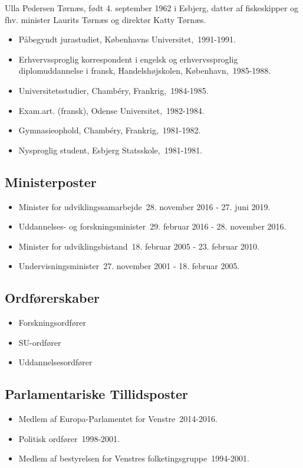 \documentclass[11pt, a4paper]{awesome-cv}
\begin{document}
\makecvheader[R]
\makelettertitle
\begin{cvletter}
Ulla Pedersen Tørnæs, født 4. september 1962 i Esbjerg, datter af fiskeskipper og fhv. minister Laurits Tørnæs og direktør Katty Tørnæs.

\begin{itemize}
\item Påbegyndt jurastudiet, Københavns Universitet, 1991-1991.
\item Erhvervssproglig korrespondent i engelsk og erhvervssproglig diplomuddannelse i fransk, Handelshøjskolen, København, 1985-1988.
\item Universitetsstudier, Chambéry, Frankrig, 1984-1985.
\item Exam.art. (fransk), Odense Universitet, 1982-1984.
\item Gymnasieophold, Chambéry, Frankrig, 1981-1982.
\item Nysproglig student, Esbjerg Statsskole, 1981-1981.
\end{itemize}
\subsection*{Ministerposter}
\begin{itemize}
\item Minister for udviklingssamarbejde 28. november 2016 - 27. juni 2019.
\item Uddannelses- og forskningsminister 29. februar 2016 - 28. november 2016.
\item Minister for udviklingsbistand 18. februar 2005 - 23. februar 2010.
\item Undervisningsminister 27. november 2001 - 18. februar 2005.
\end{itemize}
\subsection*{Ordførerskaber}
\begin{itemize}
\item Forskningsordfører
\item SU-ordfører
\item Uddannelsesordfører
\end{itemize}
\subsection*{Parlamentariske Tillidsposter}
\begin{itemize}
\item Medlem af Europa-Parlamentet for Venstre 2014-2016.
\item Politisk ordfører 1998-2001.
\item Medlem af bestyrelsen for Venstres folketingsgruppe 1994-2001.
\end{itemize}

\end{cvletter}
\end{document}
